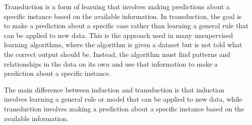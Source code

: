 \begin{definition}[Transduction]
	Transduction is a form of learning that involves making predictions about a specific instance based on the available information. In transduction, the goal is to make a prediction about a specific case rather than learning a general rule that can be applied to new data. This is the approach used in many unsupervised learning algorithms, where the algorithm is given a dataset but is not told what the correct output should be. Instead, the algorithm must find patterns and relationships in the data on its own and use that information to make a prediction about a specific instance.

\end{definition}
The main difference between induction and transduction is that induction involves learning a general rule or model that can be applied to new data, while transduction involves making a prediction about a specific instance based on the available information.
